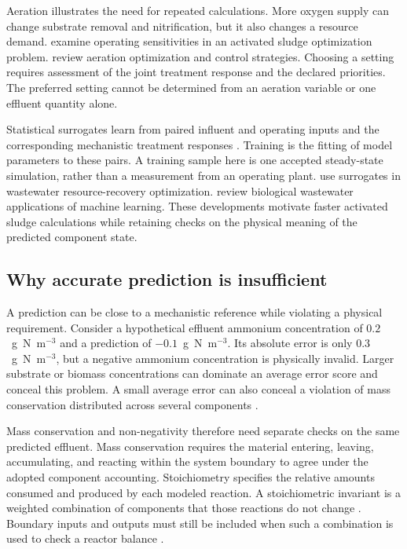 Aeration illustrates the need for repeated calculations. More oxygen supply can change substrate removal and nitrification, but it also changes a resource demand. \citet{Araujo2013} examine operating sensitivities in an activated sludge optimization problem. \citet{Gu2023} review aeration optimization and control strategies. Choosing a setting requires assessment of the joint treatment response and the declared priorities. The preferred setting cannot be determined from an aeration variable or one effluent quantity alone.

Statistical surrogates learn from paired influent and operating inputs and the corresponding mechanistic treatment responses \citep{Fang2011,Selerio2026}. Training is the fitting of model parameters to these pairs. A training sample here is one accepted steady-state simulation, rather than a measurement from an operating plant. \citet{Durkin2024} use surrogates in wastewater resource-recovery optimization. \citet{Sundui2021} review biological wastewater applications of machine learning. These developments motivate faster activated sludge calculations while retaining checks on the physical meaning of the predicted component state.

\subsection{Why accurate prediction is insufficient}

A prediction can be close to a mechanistic reference while violating a physical requirement. Consider a hypothetical effluent ammonium concentration of $0.2$~g~N~m$^{-3}$ and a prediction of $-0.1$~g~N~m$^{-3}$. Its absolute error is only $0.3$~g~N~m$^{-3}$, but a negative ammonium concentration is physically invalid. Larger substrate or biomass concentrations can dominate an average error score and conceal this problem. A small average error can also conceal a violation of mass conservation distributed across several components \citep{Hansen2024,KircherVotsmeier2025}.

Mass conservation and non-negativity therefore need separate checks on the same predicted effluent. Mass conservation requires the material entering, leaving, accumulating, and reacting within the system boundary to agree under the adopted component accounting. Stoichiometry specifies the relative amounts consumed and produced by each modeled reaction. A stoichiometric invariant is a weighted combination of components that those reactions do not change \citep{Henze2006,SturmWexler2020,SturmWexler2022}. Boundary inputs and outputs must still be included when such a combination is used to check a reactor balance \citep{TakacsVanrolleghem2006}.

